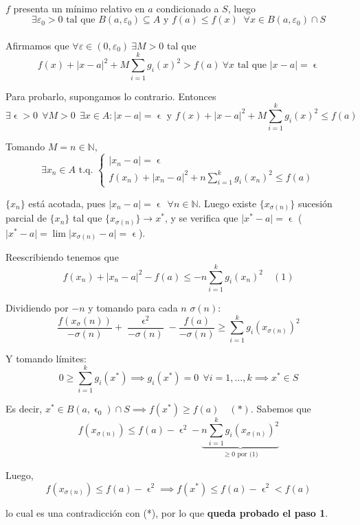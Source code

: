 \documentclass[11pt, a4paper]{article}
\makeatletter
\let\epsilon\upvarepsilon
\renewenvironment{proof}[1][\proofname] {\vspace{-15pt}\par\pushQED{\qed}\normalfont\topsep6\p@\@plus6\p@\relax\trivlist\item[\hskip\labelsep\it#1\@addpunct{.}]\ignorespaces}{\popQED\endtrivlist\@endpefalse}
\providecommand{\abs}[1]{\lvert#1\rvert}
\theoremstyle{theorem-style}
\theoremstyle{definition-style}
\theoremstyle{remark-style}
\theoremstyle{example-style}
\makeatother
\begin{document}
\begin{proof}[Demostración (método de penalización)]\hfill\\
	
	$f$ presenta un mínimo relativo en $a$ condicionado a $S$, luego
	\[
	\exists \varepsilon_0 >0 \text{ tal que } B(a, \varepsilon_0) \subseteq A \text{ y } f(a) \le f(x) \;\;\forall x\in B(a, \varepsilon_0)\cap S
	\]
	\hfill\\
	Afirmamos que $\forall \varepsilon\in (0,\varepsilon_0)\ \exists M>0$ tal que
	\[
		f(x) + \abs{x-a}^2 + M\sum_{i=1}^k g_i(x)^2 > f(a)\ \forall x \text{ tal que } \abs{x-a} = \epsilon
	\]
	
	Para probarlo, supongamos lo contrario. Entonces
	\[
		\exists\epsilon>0\ \ \forall M>0\ \ \exists x\in A : \abs{x-a} = \epsilon \text{ y } f(x) + \abs{x-a}^2 + M \sum_{i=1}^k g_i(x)^2 \le f(a)
	\]
	
	Tomando $M = n\in \mathbb{N}$,
	\[
	\exists x_n\in A \text{ t.q. } \begin{cases}
	\abs{x_n-a} = \epsilon\\
	f(x_n) + \abs{x_n-a}^2+n\sum_{i=1}^k g_i(x_n)^2 \le f(a)
\end{cases}
	\]
	
	$\{x_n\}$ está acotada, pues $\abs{x_n-a} = \epsilon \ \ \forall n\in \mathbb{N}$. Luego existe $\{x_{\sigma(n)}\}$ sucesión parcial de $\{x_n\}$ tal que $\{x_{\sigma(n)}\}\to x^*$, y se verifica que $\abs{x^*-a} = \epsilon$ ($\abs{x^*-a} = \lim \abs{x_{\sigma(n)}-a} = \epsilon$).
	
	Reescribiendo tenemos que 
	\[f(x_n) + \abs{x_n-a}^2-f(a) \le -n\sum_{i=1}^k g_i(x_n)^2\quad(1)
	\]
	
	Dividiendo por $-n$ y tomando para cada $n$ $\sigma(n)$:
	\[
		\frac{f(x_\sigma(n))}{-\sigma(n)} + \frac{\epsilon^2}{-\sigma(n)}-\frac{f(a)}{-\sigma(n)} \ge \sum_{i=1}^k g_i(x_{\sigma(n)})^2
	\]
	
	Y tomando límites:
	\[0 \ge \sum_{i=1}^k g_i(x^*) \implies g_i(x^*) = 0 \ \ \forall i=1,\dots,k \implies x^*\in S\]
	
	Es decir, $x^*\in B(a,\epsilon_0)\cap S \implies f(x^*) \ge f(a)\quad (*)$. Sabemos que
	\[
		f(x_{\sigma(n)}) \le f(a) - \epsilon^2 -\underbrace{n\sum_{i=1}^k g_i(x_{\sigma(n)})^2}_{\ge 0 \text{ por (1)}}
	\]
	
	Luego,
	\[
	f(x_{\sigma(n)}) \le f(a) - \epsilon^2 \implies f(x^*) \le f(a) - \epsilon^2 < f(a)
	\]
	
	lo cual es una contradicción con (*), por lo que \textbf{queda probado el paso 1}.\\
	

\end{proof}
\end{document}
